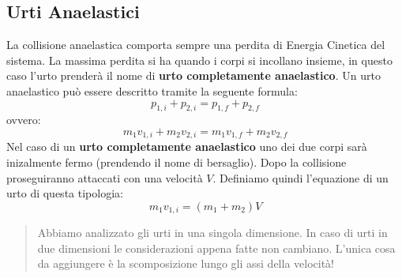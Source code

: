         \subsection{Urti Anaelastici} La collisione anaelastica comporta sempre
        una perdita di Energia Cinetica del sistema. La massima perdita si ha 
        quando i corpi si incollano insieme, in questo caso l'urto prenderà il 
        nome di \textbf{urto completamente anaelastico}.
        Un urto anaelastico può essere descritto tramite la seguente formula:
        \begin{equation}
            p_{1,i} + p_{2,i} = p_{1,f} + p_{2,f}
        \end{equation}
        ovvero:
        \begin{equation*}
            m_1v_{1,i} + m_2v_{2,i} = m_1v_{1,f} + m_2v_{2,f}
        \end{equation*}
        Nel caso di un \textbf{urto completamente anaelastico} uno dei due 
        corpi sarà inizalmente fermo (prendendo il nome di bersaglio). Dopo la 
        collisione proseguiranno attaccati con una velocità $V$. Definiamo 
        quindi l'equazione di un urto di questa tipologia:
        \begin{equation}
            m_1v_{1,i} = (m_1+m_2)V
        \end{equation} 
        \begin{quote}
            Abbiamo analizzato gli urti in una singola dimensione. In caso di 
            urti in due dimensioni le considerazioni appena fatte non cambiano.
            L'unica cosa da aggiungere è la scomposizione lungo gli assi della
            velocità!
        \end{quote}
        


